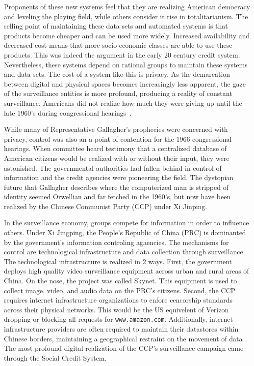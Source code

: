 Proponents of these new systems feel that they are realizing American democracy
and leveling the playing field, while others consider it rise in
totalitarianism. The selling point of maintaining these data sets and
automated systems is that products become cheaper and can be used more widely.
Increased availability and decreased cost means that more socio-economic
classes are able to use these products. This was indeed the argument in the
early 20 century credit system. Nevertheless, these systems depend on
rational groups to maintain these systems and data sets. The cost of a system
like this is privacy. As the demarcation between digital and physical spaces
becomes increasingly less apparent, the gaze of the surveillance entities is
more profound, producing a reality of constant surveillance. Americans did not
realize how much they were giving up until the late 1960's during congressional
hearings~\cite{lauer2017creditworthy}.

While many of Representative Gallagher's prophecies were concerned with privacy,
control was also an a point of contention for the 1966 congressional hearings.
When committee heard testimony that a centralized database of American citizens would
be realized with or without their input, they were astonished. The governmental
authorities had fallen behind in control of information and the credit agencies were
pioneering the field. The dystopian future that Gallagher describes where the computerized
man is stripped of identity seemed Orwellian and far fetched in the 1960's, but
now have been realized by the Chinese Communist Party (CCP) under Xi Jinping.

In the surveillance economy, groups compete for information in order to
influence others. Under Xi Jingping, the People's Republic of China (PRC) is
dominanted by the government's information controling agaencies. The mechanisms
for control are technological infrastructure and data collection through
surveillance. The technological infrastructure is realized in 2 ways.
First, the government deploys high quality video surveillance equipment
across urban and rural areas of China. On the nose, the project was called Skynet.
This equipment is used to collect image, video, and audio data on the PRC's citizens. Second, the
CCP requires internet infrastructure organizations to enfore cencorship
standards across their physical networks. This would be the US
equivelent of Verizon dropping or blocking all requests for
\texttt{www.amazon.com}. Additionally, internet infrastructure
providers are often required to maintain their datastores within
Chinese borders, maintaining a geographical restraint on the movement
of data~\cite{qiang2019road}. The most profound digital realization of the
CCP's surveillance campaign came through the Social Credit System.

